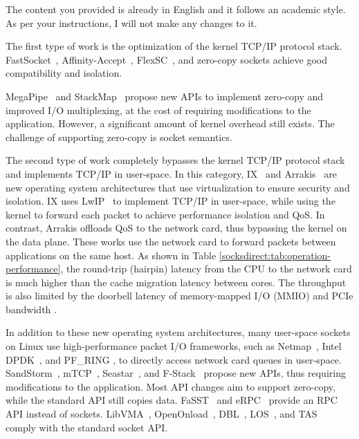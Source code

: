 The content you provided is already in English and it follows an academic style. As per your instructions, I will not make any changes to it.

The first type of work is the optimization of the kernel TCP/IP protocol stack. FastSocket~\cite{lin2016scalable}, Affinity-Accept~\cite{pesterev2012improving}, FlexSC~\cite{soares2010flexsc}, and zero-copy sockets \cite{thadani1995efficient,chu1996zero,linux-zero-copy} achieve good compatibility and isolation.

MegaPipe~\cite{han2012megapipe} and StackMap~\cite{yasukata2016stackmap} propose new APIs to implement zero-copy and improved I/O multiplexing, at the cost of requiring modifications to the application. However, a significant amount of kernel overhead still exists. The challenge of supporting zero-copy is socket semantics.

The second type of work completely bypasses the kernel TCP/IP protocol stack and implements TCP/IP in user-space. In this category, IX~\cite{belay2017ix} and Arrakis~\cite{peter2016arrakis} are new operating system architectures that use virtualization to ensure security and isolation. IX uses LwIP~\cite{dunkels2001design} to implement TCP/IP in user-space, while using the kernel to forward each packet to achieve performance isolation and QoS. In contrast, Arrakis offloads QoS to the network card, thus bypassing the kernel on the data plane. These works use the network card to forward packets between applications on the same host. As shown in Table \ref{socksdirect:tab:operation-performance}, the round-trip (hairpin) latency from the CPU to the network card is much higher than the cache migration latency between cores. The throughput is also limited by the doorbell latency of memory-mapped I/O (MMIO) and PCIe bandwidth \cite{neugebauer2018understanding,li2017kv}.

In addition to these new operating system architectures, many user-space sockets on Linux use high-performance packet I/O frameworks, such as Netmap~\cite{rizzo2012netmap}, Intel DPDK~\cite{dpdk}, and PF\_RING \cite{pf-ring}, to directly access network card queues in user-space. SandStorm~\cite{marinos2014network}, mTCP~\cite{jeong2014mtcp}, Seastar~\cite{seastar}, and F-Stack~\cite{fstack} propose new APIs, thus requiring modifications to the application. Most API changes aim to support zero-copy, while the standard API still copies data. FaSST~\cite{kalia2016fasst} and eRPC~\cite{kalia2018datacenter} provide an RPC API instead of sockets. LibVMA~\cite{libvma}, OpenOnload~\cite{openonload}, DBL~\cite{dbl}, LOS~\cite{huang2017high}, and TAS~\cite{taseurosys19} comply with the standard socket API.

